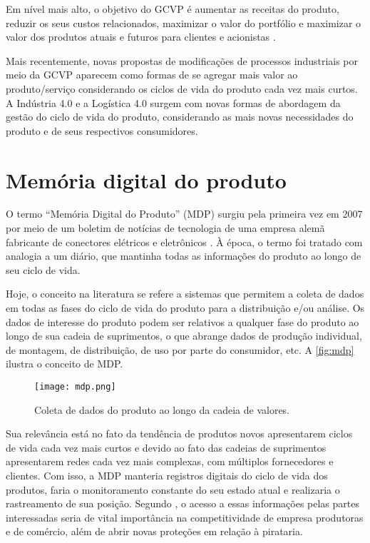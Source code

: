 Em nível mais alto, o objetivo do GCVP é aumentar as receitas do produto, reduzir os seus custos relacionados, maximizar o valor do portfólio e maximizar o valor dos produtos atuais e futuros para clientes e acionistas \cite{stark2015lifecycle}.

Mais recentemente, novas propostas de modificações de processos industriais por meio da GCVP aparecem como formas de se agregar mais valor ao produto/serviço considerando os ciclos de vida do produto cada vez mais curtos. A Indústria 4.0 e a Logística 4.0 surgem com novas formas de abordagem da gestão do ciclo de vida do produto, considerando as mais novas necessidades do produto e de seus respectivos consumidores.

\section{Memória digital do produto}

O termo ``Memória Digital do Produto'' (MDP) surgiu pela primeira vez em 2007 por meio de um boletim de notícias de tecnologia de uma empresa alemã fabricante de conectores elétricos e eletrônicos \cite{wahlster2007digitalmemory}. À época, o termo foi tratado com analogia a um diário, que mantinha todas as informações do produto ao longo de seu ciclo de vida.

Hoje, o conceito na literatura se refere a sistemas que permitem a coleta de dados em todas as fases do ciclo de vida do produto para a distribuição e/ou análise. Os dados de interesse do produto podem ser relativos a qualquer fase do produto ao longo de sua cadeia de suprimentos, o que abrange dados de produção individual, de montagem, de distribuição, de uso por parte do consumidor, etc. A \autoref{fig:mdp} ilustra o conceito de MDP.

\begin{figure}[htb]
	\centering
	\texttt{[image: mdp.png]}
	\caption{Coleta de dados do produto ao longo da cadeia de valores.}
	\label{fig:mdp}
\end{figure}

Sua relevância está no fato da tendência de produtos novos apresentarem ciclos de vida cada vez mais curtos e devido ao fato das cadeias de suprimentos apresentarem redes cada vez mais complexas, com múltiplos fornecedores e clientes. Com isso, a MDP manteria registros digitais do ciclo de vida dos produtos, faria o monitoramento constante do seu estado atual e realizaria o rastreamento de sua posição. Segundo , o acesso a essas informações pelas partes interessadas seria de vital importância na competitividade de empresa produtoras e de comércio, além de abrir novas proteções em relação à pirataria.

